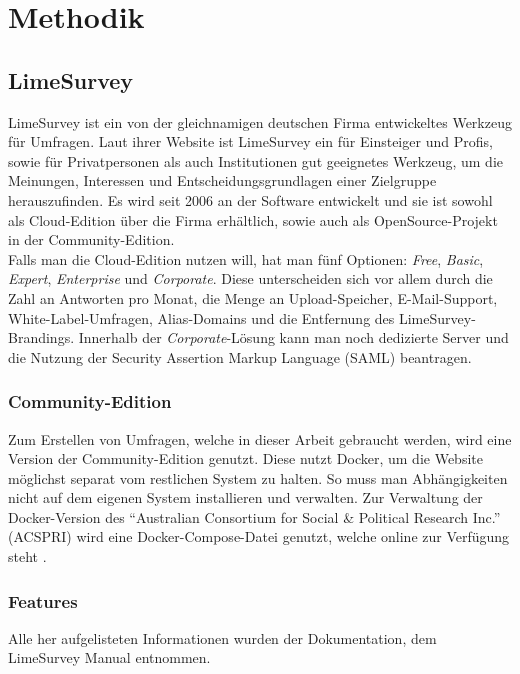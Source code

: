 \chapter{Methodik}
\label{ch:methodik}

\section{LimeSurvey}

LimeSurvey ist ein von der gleichnamigen deutschen Firma entwickeltes Werkzeug für Umfragen.
Laut ihrer Website\cite{ls} ist LimeSurvey ein für Einsteiger und Profis, sowie für Privatpersonen als auch Institutionen gut geeignetes Werkzeug, um die Meinungen, Interessen und Entscheidungsgrundlagen einer Zielgruppe herauszufinden.
Es wird seit 2006 an der Software entwickelt und sie ist sowohl als Cloud-Edition über die Firma erhältlich, sowie auch als OpenSource-Projekt in der Community-Edition.\\

Falls man die Cloud-Edition nutzen will, hat man fünf Optionen: \textit{Free}, \textit{Basic}, \textit{Expert}, \textit{Enterprise} und \textit{Corporate}.
Diese unterscheiden sich vor allem durch die Zahl an Antworten pro Monat, die Menge an Upload-Speicher, E-Mail-Support, White-Label-Umfragen, Alias-Domains und die Entfernung des LimeSurvey-Brandings.
Innerhalb der \textit{Corporate}-Lösung kann man noch dedizierte Server und die Nutzung der Security Assertion Markup Language (SAML) beantragen.

\subsection{Community-Edition}

Zum Erstellen von Umfragen, welche in dieser Arbeit gebraucht werden, wird eine Version der Community-Edition genutzt.
Diese nutzt Docker, um die Website möglichst separat vom restlichen System zu halten.
So muss man Abhängigkeiten nicht auf dem eigenen System installieren und verwalten.
Zur Verwaltung der Docker-Version des \enquote{Australian Consortium for Social \& Political Research Inc.} (ACSPRI) wird eine Docker-Compose-Datei genutzt, welche online zur Verfügung steht \cite{docker_comp}.

\subsection{Features}

Alle her aufgelisteten Informationen wurden der Dokumentation, dem LimeSurvey Manual\cite{lsm} entnommen.

